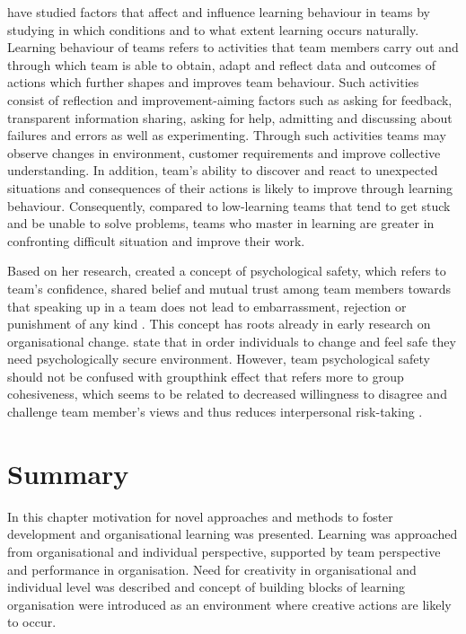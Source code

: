 \citet{edmondson1999psychological} have studied factors that affect and influence learning behaviour in teams by studying in which conditions and to what extent learning occurs naturally. Learning behaviour of teams refers to activities that team members carry out and through which team is able to obtain, adapt and reflect data and outcomes of actions which further shapes and improves team behaviour. Such activities consist of reflection and improvement-aiming factors such as asking for feedback, transparent information sharing, asking for help, admitting and discussing about failures and errors as well as experimenting. Through such activities teams may observe changes in environment, customer requirements and improve collective understanding. In addition, team's ability to discover and react to unexpected situations and consequences of their actions is likely to improve through learning behaviour. Consequently, compared to low-learning teams that tend to get stuck and be unable to solve problems, teams who master in learning are greater in confronting difficult situation and improve their work. \citep{edmondson1999psychological}

Based on her research, \citet{edmondson1999psychological} created a concept of psychological safety, which refers to team's confidence, shared belief and mutual trust among team members towards that speaking up in a team does not lead to embarrassment, rejection or punishment of any kind \citep{edmondson1999psychological}. This concept has roots already in early research on organisational change. \citet{schein1965personal} state that in order individuals to change and feel safe they need psychologically secure environment. However, team psychological safety should not be confused with groupthink effect that refers more to group cohesiveness, which seems to be related to decreased willingness to disagree and challenge team member's views and thus reduces interpersonal risk-taking \citep{janis1982groupthink}.

\section{Summary}
In this chapter motivation for novel approaches and methods to foster development and organisational learning was presented. Learning was approached from organisational and individual perspective, supported by team perspective and performance in organisation. Need for creativity in organisational and individual level was described and concept of building blocks of learning organisation were introduced as an environment where creative actions are likely to occur. 

